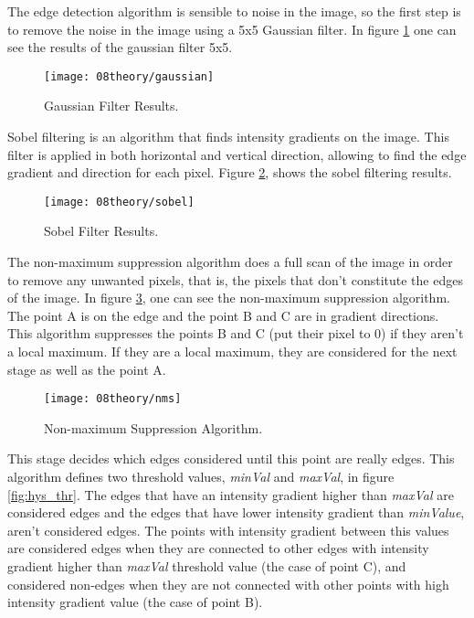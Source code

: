 The edge detection algorithm is sensible to noise in the image, so the first step is to remove the noise in the image using a 5x5 Gaussian filter. In figure \ref{fig:gaussian} one can see the results of the gaussian filter 5x5. 

\begin{figure}[H]
	\centering
	\texttt{[image: 08theory/gaussian]}
	\caption{Gaussian Filter Results.}
	\label{fig:gaussian}
\end{figure}

Sobel filtering is an algorithm that finds intensity gradients on the image. This filter is applied in both horizontal and vertical direction, allowing to find the edge gradient and direction for each pixel. Figure \ref{fig:sobel}, shows the sobel filtering results.

\begin{figure}[H]
	\centering
	\texttt{[image: 08theory/sobel]}
	\caption{Sobel Filter Results.}
	\label{fig:sobel}
\end{figure}

The non-maximum suppression algorithm does a full scan of the image in order to remove any unwanted pixels, that is, the pixels that don't constitute the edges of the image. In figure \ref{fig:nms}, one can see the non-maximum suppression algorithm. The point A is on the edge and the point B and C are in gradient directions. This algorithm suppresses the points B and C (put their pixel to 0) if they aren't a local maximum. If they are a local maximum, they are considered for the next stage as well as the point A.

\begin{figure}[H]
	\centering
	\texttt{[image: 08theory/nms]}
	\caption{Non-maximum Suppression Algorithm.}
	\label{fig:nms}
\end{figure}

This stage decides which edges considered until this point are really edges. This algorithm defines two threshold values, \textit{minVal} and \textit{maxVal}, in figure \ref{fig:hys_thr}. The edges that have an intensity gradient higher than \textit{maxVal} are considered edges and the edges that have lower intensity gradient than \textit{minValue}, aren't considered edges. The points with intensity gradient between this values are considered edges when they are connected to other edges with intensity gradient higher than \textit{maxVal} threshold value (the case of point C), and considered non-edges when they are not connected with other points with high intensity gradient value (the case of point B). 

